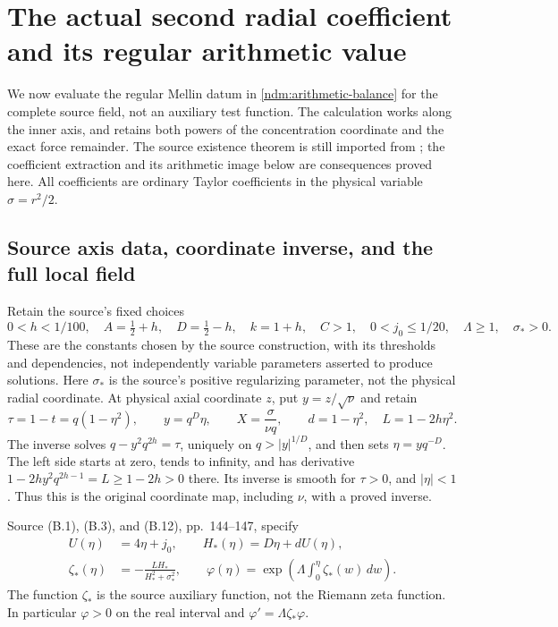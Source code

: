 \section{The actual second radial coefficient and its regular arithmetic value}
\label{sec:ns-actual-second-radial}

We now evaluate the regular Mellin datum in
\eqref{ndm:arithmetic-balance} for the complete source field, not an
auxiliary test function. The calculation works along the inner axis,
and retains both powers of the concentration coordinate and the exact
force remainder. The source existence theorem is still imported from
\cite{openaiNS2026release}; the coefficient extraction and its arithmetic
image below are consequences proved here. All coefficients are ordinary
Taylor coefficients in the physical variable \(\sigma=r^2/2\).

\subsection{Source axis data, coordinate inverse, and the full local field}

Retain the source's fixed choices
\[
 0<h<1/100,\quad A=\tfrac12+h,\quad D=\tfrac12-h,\quad
 k=1+h,\quad C>1,\quad 0<j_0\leq1/20,\quad
 \Lambda\geq1,\quad \sigma_*>0 .
\]
These are the constants chosen by the source construction, with its
thresholds and dependencies, not independently variable parameters
asserted to produce solutions. Here \(\sigma_*\) is the source's
positive regularizing parameter, not the physical radial coordinate.
At physical axial coordinate \(z\), put \(y=z/\sqrt\nu\) and retain
\begin{equation}\label{nsr:coordinates}
 \tau=1-t=q(1-\eta^2),\qquad y=q^D\eta,\qquad
 X=\frac{\sigma}{\nu q},\qquad
 d=1-\eta^2,\quad L=1-2h\eta^2.
\end{equation}
The inverse solves \(q-y^2q^{2h}=\tau\), uniquely on
\(q>|y|^{1/D}\), and then sets \(\eta=yq^{-D}\).
The left side starts at zero, tends to infinity, and has derivative
\(1-2hy^2q^{2h-1}=L\geq1-2h>0\) there. Its inverse is smooth
for \(\tau>0\), and \(|\eta|<1\). Thus this is the original
coordinate map, including \(\nu\), with a proved inverse.

Source (B.1), (B.3), and (B.12), pp.~144--147, specify
\begin{equation}\label{nsr:profiles}
 \begin{split}
 U(\eta)&=4\eta+j_0,\qquad H_*(\eta)=D\eta+dU(\eta),\\
 \zeta_*(\eta)&=-\frac{L H_*}{H_*^2+\sigma_*^2},\qquad
 \varphi(\eta)=\exp\left(\Lambda\int_0^\eta\zeta_*(w)\,dw\right).
 \end{split}
\end{equation}
The function \(\zeta_*\) is the source auxiliary function, not the
Riemann zeta function. In particular \(\varphi>0\) on the real
interval and \(\varphi'=\Lambda\zeta_*\varphi\).

